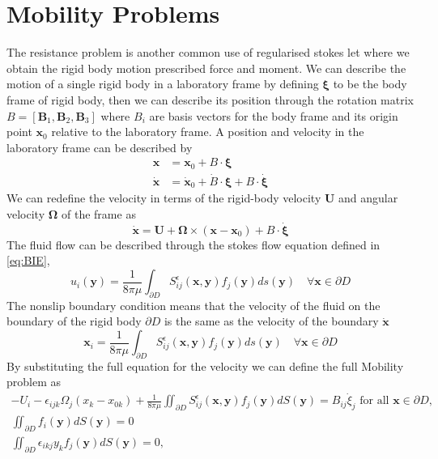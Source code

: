 \section{Mobility Problems}
The resistance problem is another common use of regularised stokes let where we obtain the rigid body motion prescribed force and moment. We can describe the motion of a single rigid body in a laboratory frame by defining  $\bm{\xi}$ to be the body frame of rigid body, then we can describe its position through the rotation matrix $B = [\bm{B}_1,\bm{B}_2,\bm{B}_3]$ where $B_i$ are basis vectors for the body frame and its origin point $\bm{x}_0$ relative to the laboratory frame. A position and velocity in the laboratory frame can be described by
\begin{equation*}
\begin{aligned}
    \bm{x} &= \bm{x}_0 + B\cdot\bm{\xi} \\
    \dot{\bm{x}} &= \dot{\bm{x}}_0 + \dot{B}\cdot\bm{\xi} + B\cdot\dot{\bm{\xi}}
\end{aligned}
\end{equation*}
We can redefine the velocity in terms of the rigid-body velocity $\bm{U}$ and angular velocity $\bm{\Omega}$ of the frame as
\begin{equation*}
    \dot{\bm{x}} = \bm{U} + \bm{\Omega}\times (\bm{x}-\bm{x}_0) + B\cdot\dot{\bm{\xi}}
\end{equation*}
The fluid flow can be described through the stokes flow equation defined in \cref{eq:BIE},
\begin{equation*}
    u_i(\bm{y}) = \frac{1}{8 \pi \mu} \int_{\partial D} S_{i j}^{\epsilon}\left(\bm{x}, \bm{y}\right) f_{j}(\bm{y}) d s(\bm{y}) \quad \forall \bm{x}\in\partial D
\end{equation*}
The nonslip boundary condition means that the velocity of the fluid on the boundary of the rigid body $\partial D$ is the same as the velocity of the boundary $\dot{\bm{x}}$
\begin{equation*}
    \bm{x}_i = \frac{1}{8 \pi \mu} \int_{\partial D} S_{i j}^{\epsilon}\left(\bm{x}, \bm{y}\right) f_{j}(\bm{y}) d s(\bm{y}) \quad \forall \bm{x}\in\partial D
\end{equation*}
By substituting the full equation for the velocity we can define the full Mobility problem as
\begin{equation}
\label{eq:MobilityProblem}
\begin{gathered}
    -U_{i}-\epsilon_{i j k} \Omega_{j}\left(x_{k}-x_{0 k}\right)+\frac{1}{8 \pi\mu} \iint_{\partial D} S_{i j}^{\epsilon}(\bm{x}, \bm{y}) f_{j}(\bm{y}) d S({\bm{y}})=B_{i j} \dot{\xi}_{j} \text { for all } \bm{x} \in \partial D, \\
    \iint_{\partial D} f_{i}(\bm{y}) d S({\bm{y}})=0 \\
    \iint_{\partial D} \epsilon_{i k j} y_{k} f_{j}(\bm{y}) d S({\bm{y}})=0,
\end{gathered}
\end{equation}
